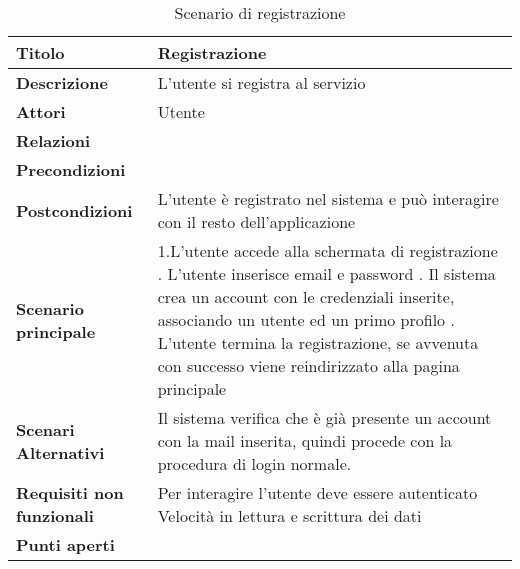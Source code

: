 \begin{table}[htb]
    \begin{tabular} {|P{4.5cm}|P{11cm}|}
        \hline
        \textbf{Titolo}                   & Registrazione                                                                         \\
        \hline
        \textbf{Descrizione}              & L'utente si registra al servizio                                                      \\
        \hline
        \textbf{Attori}                   & Utente                                                                                \\
        \hline
        \textbf{Relazioni}                &                                                                                       \\
        \hline
        \textbf{Precondizioni}            &                                                                                       \\
        \hline
        \textbf{Postcondizioni}           & L'utente è registrato nel sistema e può interagire con il resto dell'applicazione     \\
        \hline
        \textbf{Scenario principale}      & 1.L'utente accede alla schermata di registrazione      . L'utente inserisce email e  password                      . Il sistema crea un account con le credenziali inserite, associando un utente ed un primo profilo   . L'utente termina la registrazione, se avvenuta con successo viene reindirizzato alla pagina principale
        \\
        \hline
        \textbf{Scenari Alternativi}      &

        Il sistema verifica che è già presente un account con la mail inserita, quindi procede con la procedura di login normale. \\
        \hline
        \textbf{Requisiti non funzionali} &
        Per interagire l’utente deve essere autenticato \linebreak
        Velocità in lettura e scrittura dei dati                                                                                  \\
        \hline
        \textbf{Punti aperti}             &                                                                                       \\
        \hline
    \end{tabular}

    \caption{Scenario di registrazione}
\end{table}

